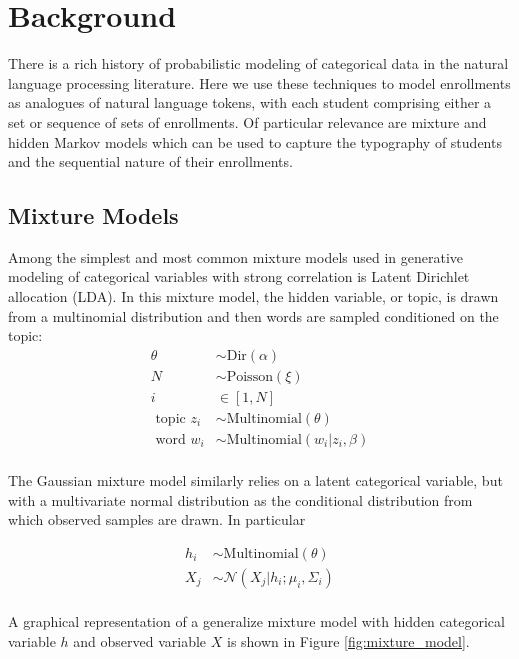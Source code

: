 \documentclass{edm_template}
\begin{document}
\section{Background}

There is a rich history of probabilistic modeling of categorical data in the natural language processing literature. Here we use these techniques to model enrollments as analogues of natural language tokens, with each student comprising either a set or sequence of sets of enrollments. Of particular relevance are mixture and hidden Markov models which can be used to capture the typography of students and the sequential nature of their enrollments. 

\subsection{Mixture Models}

Among the simplest and most common mixture models used in generative modeling of categorical variables with strong correlation is Latent Dirichlet allocation (LDA). In this mixture model, the hidden variable, or topic, is drawn from a multinomial distribution and then words are sampled conditioned on the topic:
\begin{align*}
\theta &\sim \text{Dir}(\alpha) \\
N &\sim \text{Poisson}(\xi) \\
i &\in [1,N] \\
\text{ topic } z_i &\sim \text{Multinomial}(\theta) \\
\text{ word } w_i &\sim \text{Multinomial}(w_i | z_i, \beta) \\ 	
\end{align*}

\vspace{-7mm}
The Gaussian mixture model similarly relies on a latent categorical variable, but with a multivariate normal distribution as the conditional distribution from which observed samples are drawn. In particular
\vspace{-7mm}

\begin{align*}
h_i &\sim \text{Multinomial}(\theta) \\
X_j &\sim \mathcal{N}(X_j | h_i ; \mu_i, \Sigma_i) \\
\end{align*}

\vspace{-7mm}
A graphical representation of a generalize mixture model with hidden categorical variable $h$ and observed variable $X$ is shown in Figure \ref{fig:mixture_model}. 
\end{document}
